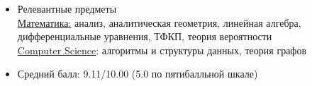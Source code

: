\begin{itemize}
\item Релевантные предметы \\
	\underline{Математика:} анализ, аналитическая геометрия, линейная алгебра, дифференциальные уравнения, ТФКП, теория вероятности\\
	\underline{Computer Science}: алгоритмы и структуры данных, теория графов\\
\item Средний балл: 9.11/10.00 (5.0 по пятибалльной шкале)
\end{itemize}
